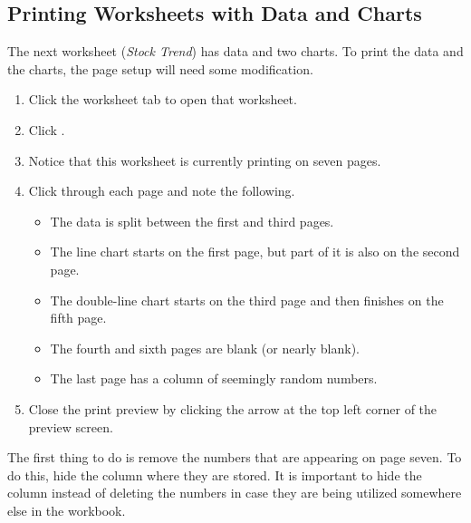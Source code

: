 \subsection{Printing Worksheets with Data and Charts}

The next worksheet (\textit{Stock Trend}) has data and two charts. To print the data and the charts, the page setup will need some modification.

\begin{enumerate}
	\item Click the  worksheet tab to open that worksheet.
	\item Click .
	\item Notice that this worksheet is currently printing on seven pages.
	\item Click through each page and note the following.

	\begin{itemize}
		\item The data is split between the first and third pages.
		\item The line chart starts on the first page, but part of it is also on the second page.
		\item The double-line chart starts on the third page and then finishes on the fifth page.
		\item The fourth and sixth pages are blank (or nearly blank).
		\item The last page has a column of seemingly random numbers.
	\end{itemize}

	\item Close the print preview by clicking the arrow at the top left corner of the preview screen.
\end{enumerate}

The first thing to do is remove the numbers that are appearing on page seven. To do this, hide the column where they are stored. It is important to hide the column instead of deleting the numbers in case they are being utilized somewhere else in the workbook.

